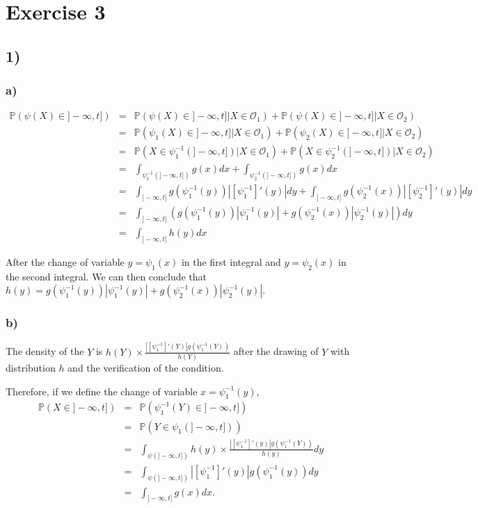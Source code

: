 \section*{Exercise 3}
\subsection*{1)}
\subsubsection*{a)}

\begin{eqnarray*}
\mathbb{P}(\psi(X) \in ]-\infty,t]) &=& \mathbb{P}(\psi(X) \in ]-\infty,t] | X \in \mathcal{O}_1) + \mathbb{P}(\psi(X) \in ]-\infty,t] | X \in \mathcal{O}_2)\\
	&=& \mathbb{P}(\psi_1(X) \in ]-\infty,t] | X \in \mathcal{O}_1) + \mathbb{P}(\psi_2(X) \in ]-\infty,t] | X \in \mathcal{O}_2)\\
&=& \mathbb{P}(X \in \psi_1^{-1}(]-\infty,t]) | X \in \mathcal{O}_1) + \mathbb{P}(X \in \psi_2^{-1}(]-\infty,t]) | X \in \mathcal{O}_2)\\
	&=& \int_{\psi_1^{-1}(]-\infty,t])} g(x) dx + \int_{\psi_2^{-1}(]-\infty,t])} g(x) dx\\
&=& \int_{]-\infty,t]} g(\psi_1^{-1}(y)) |[\psi_1^{-1}]'(y)|dy + \int_{]-\infty,t]} g(\psi_2^{-1}(x)) |[\psi_2^{-1}]'(y)|dy\\
	&=& \int_{]-\infty,t]} \left(g(\psi_1^{-1}(y)) |\psi_1^{-1}(y)| + g(\psi_2^{-1}(x)) |\psi_2^{-1}(y)|\right) dy\\
	&=& \int_{]-\infty,t]} h(y) dx
\end{eqnarray*}

After the change of variable $y = \psi_1(x)$ in the first integral and $y = \psi_2(x)$ in the second integral.
We can then conclude that $h(y) = g(\psi_1^{-1}(y)) |\psi_1^{-1}(y)| + g(\psi_2^{-1}(x)) |\psi_2^{-1}(y)|$.

\subsubsection*{b)}
The density of the $Y$ is $h(Y) \times \frac{|[\psi_1^{-1}]'(Y)| g(\psi_1^{-1}(Y))}{h(Y)}$ after the drawing of $Y$ with distribution $h$ and the verification of the condition.

Therefore, if we define the change of variable $x= \psi_1^{-1}(y)$,
\begin{eqnarray*}
	\mathbb{P}(X \in ]-\infty,t]) &=& \mathbb{P}(\psi_1^{-1}(Y) \in ]-\infty,t])\\
	&=& \mathbb{P}(Y \in \psi_1(]-\infty,t]))\\
	&=& \int_{\psi(]-\infty,t])} h(y) \times \frac{|[\psi_1^{-1}]'(y)| g(\psi_1^{-1}(Y))}{h(y)}dy\\
	&=& \int_{\psi(]-\infty,t])} |[\psi_1^{-1}]'(y)| g(\psi_1^{-1}(y))dy\\
	&=& \int_{]-\infty,t]} g(x)dx.
\end{eqnarray*}

